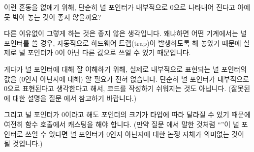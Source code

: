 \begin{faq}
	이런 혼동을 없애기 위해, 단순히 널 포인터가 내부적으로
	0으로 나타내어 진다고 아예 못 박아 놓는 것이 좋지 않을까요?

\A
	다른 이유없이 그렇게 하는 것은 좋지 않은 생각입니다.
	왜냐하면 어떤 기계에서는 널 포인터를 쓸 경우, 자동적으로
	하드웨어 트랩(trap)이 발생하도록 해 놓았기 때문에 실제로
	널 포인터가 0이 아닌 다른 값으로 쓰일 수 있기 때문입니다.

	게다가 널 포인터에 대해 잘 이해하기 위해, 실제로 내부적으로
	표현되는 널 포인터의 값을 (0인지 아닌지에 대해) 알 필요가
	전혀 없습니다.  단순히 널 포인터가 내부적으로 0으로 표현된다고
	생각한다고 해서, 코드를 작성하기 쉬워지는 것도 아닙니다.
	(잘못된 에 대한 설명을 질문 에서 참고하기 바랍니다.)
	
	그리고 널 포인터가 0이라고 해도 포인터의 크기가 타입에 따라
	달라질 수 있기 때문에 여전히 함수 호출에서 캐스팅을 해야 합니다.
	(만약 질문 에서 말한 것처럼 ``''이 널 포인터로 쓰일
	수 있다면 널 포인터가 0인지 아닌지에 대한 논쟁 자체가 의미없는
	것이 될 것입니다.)
\end{faq}

